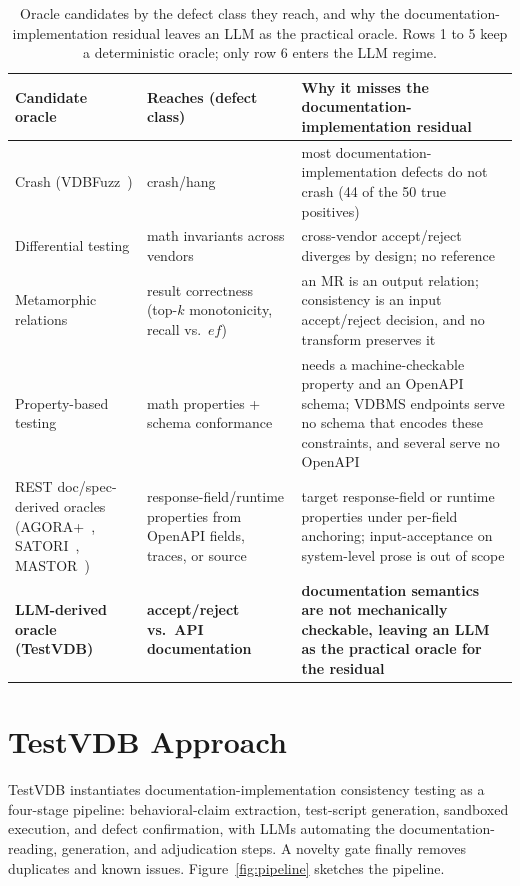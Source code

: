 \documentclass[sigconf]{acmart}
\begin{document}
\begin{table}[t]
\caption{Oracle candidates by the defect class they reach, and why the documentation-implementation residual leaves an LLM as the practical oracle. Rows 1 to 5 keep a deterministic oracle; only row 6 enters the LLM regime.}
\label{tab:exclusion}
\small
\begin{tabular}{@{}p{}p{}p{}@{}}
\toprule
Candidate oracle & Reaches (defect class) & Why it misses the documentation-implementation residual \\
\midrule
Crash (VDBFuzz~\cite{vdbfuzz26}) & crash/hang & most documentation-implementation defects do not crash (44 of the 50 true positives) \\
Differential testing & math invariants across vendors & cross-vendor accept/reject diverges by design; no reference~\cite{roadmap25} \\
Metamorphic relations~\cite{metmap24} & result correctness (top-$k$ monotonicity, recall vs.\ $ef$) & an MR is an output relation; consistency is an input accept/reject decision, and no transform preserves it \\
Property-based testing~\cite{claessen00,schemathesis,quickrest20} & math properties + schema conformance & needs a machine-checkable property and an OpenAPI schema; VDBMS endpoints serve no schema that encodes these constraints, and several serve no OpenAPI \\
REST doc/spec-derived oracles (AGORA+~\cite{agoraplus25}, SATORI~\cite{satori25}, MASTOR~\cite{mastor26}) & response-field/runtime properties from OpenAPI fields, traces, or source & target response-field or runtime properties under per-field anchoring; input-acceptance on system-level prose is out of scope \\
\textbf{LLM-derived oracle (TestVDB)} & \textbf{accept/reject vs.\ API documentation} & \textbf{documentation semantics are not mechanically checkable, leaving an LLM as the practical oracle for the residual} \\
\bottomrule
\end{tabular}
\end{table}

\section{TestVDB Approach}
\label{sec:approach}

TestVDB instantiates documentation-implementation consistency testing as a four-stage pipeline: behavioral-claim extraction, test-script generation, sandboxed execution, and defect confirmation, with LLMs automating the documentation-reading, generation, and adjudication steps. A novelty gate finally removes duplicates and known issues. Figure~\ref{fig:pipeline} sketches the pipeline.
\end{document}
